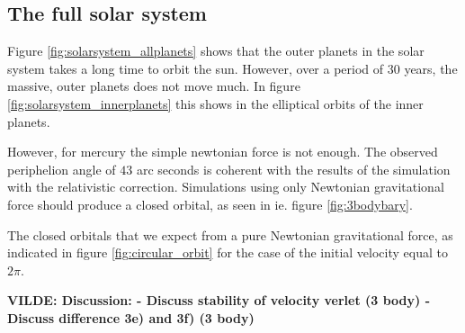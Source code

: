 \subsection{The full solar system}

Figure \ref{fig:solarsystem_allplanets} shows that the outer planets in the solar system takes a long time to orbit the sun. However, over a period of 30 years, the massive, outer planets does not move much. In figure  \ref{fig:solarsystem_innerplanets} this shows in the elliptical orbits of the inner planets. 

However, for mercury the simple newtonian force is not enough. The observed periphelion angle of $ 43 $ arc seconds is coherent with the results of the simulation with the relativistic correction. Simulations using only Newtonian gravitational force should produce a closed orbital, as seen in ie. figure \ref{fig:3bodybary}. 

The closed orbitals that we expect from a pure Newtonian gravitational force, as indicated in figure \ref{fig:circular_orbit} for the case of the initial velocity equal to $ 2\pi $. 


\textbf{VILDE:
Discussion:
- Discuss stability of velocity verlet (3 body)
- Discuss difference 3e) and 3f) (3 body)
}


